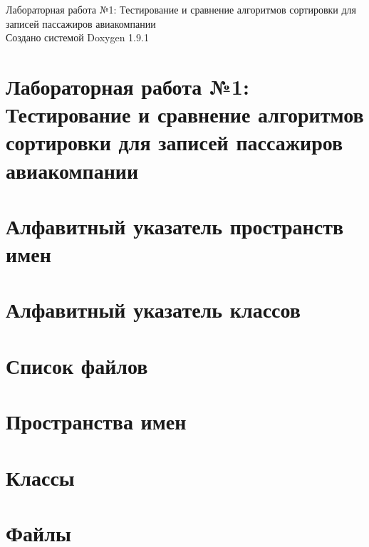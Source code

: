 \let\mypdfximage\pdfximage\def\pdfximage{\immediate\mypdfximage}\documentclass[twoside]{book}
\newcommand{\+}{\discretionary{\mbox{\scriptsize$\hookleftarrow$}}{}{}}
\newcommand{\clearemptydoublepage}{%
  \newpage{\pagestyle{empty}\cleardoublepage}%
}
\begin{document}
\raggedbottom

\hypersetup{pageanchor=false,
             bookmarksnumbered=true,
             pdfencoding=unicode
            }
\begin{titlepage}
\vspace*{7cm}
\begin{center}%
{\Large Лабораторная работа №1\+: Тестирование и сравнение алгоритмов сортировки для записей пассажиров авиакомпании }\\
\vspace*{1cm}
{\large Создано системой Doxygen 1.9.1}\\
\end{center}
\end{titlepage}
\clearemptydoublepage
{}
\tableofcontents
\clearemptydoublepage
{}
\hypersetup{pageanchor=true}

\chapter{Лабораторная работа №1\+: Тестирование и сравнение алгоритмов сортировки для записей пассажиров авиакомпании}
\label{md_README}

\chapter{Алфавитный указатель пространств имен}

\chapter{Алфавитный указатель классов}

\chapter{Список файлов}

\chapter{Пространства имен}


\chapter{Классы}

\chapter{Файлы}










\backmatter
\newpage
{}
\clearemptydoublepage
{}
\printindex
\end{document}
